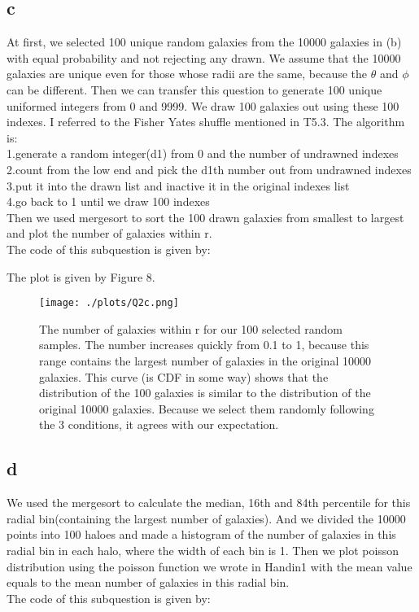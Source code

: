 \subsection{c}
At first, we selected 100 unique random galaxies from the 10000 galaxies in (b) with equal probability and not rejecting any drawn. We assume that the 10000 galaxies are unique even for those whose radii are the same, because the $\theta$ and $\phi$ can be different. Then we can transfer this question to generate 100 unique uniformed integers from 0 and 9999. We draw 100 galaxies out using these 100 indexes. I referred to the Fisher Yates shuffle mentioned in T5.3. The algorithm is:\\
1.generate a random integer(d1) from 0 and the number of undrawned indexes\\
2.count from the low end and pick the d1th number out from undrawned indexes\\
3.put it into the drawn list and inactive it in the original indexes list\\
4.go back to 1 until we draw 100 indexes\\

Then we used mergesort to sort the 100 drawn galaxies from smallest to largest and plot the number of galaxies within r.\\
The code of this subquestion is given by:


 The plot is given by Figure 8.

 \begin{figure}[h!]
   \centering
   \texttt{[image: ./plots/Q2c.png]}
   \caption{The number of galaxies within r for our 100 selected random samples. The number increases quickly from 0.1 to 1, because this range contains the largest number of galaxies in the original 10000 galaxies. This curve (is CDF in some way) shows that the distribution of the 100 galaxies is similar to the distribution of the original 10000 galaxies. Because we select them randomly following the 3 conditions, it agrees with our expectation. }
   \label{fig8}
 \end{figure}


\subsection{d}
We used the mergesort to calculate the median, 16th and 84th percentile for this radial bin(containing the largest number of galaxies). And we divided the 10000 points into 100 haloes and made a histogram of the number of galaxies in this radial bin in each halo, where the width of each bin is 1. Then we plot poisson distribution using the poisson function we wrote in Handin1 with the mean value equals to the mean number of galaxies in this radial bin.\\
The code of this subquestion is given by:


